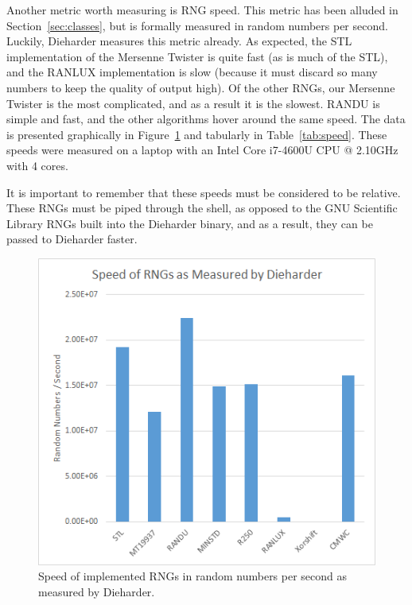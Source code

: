 

Another metric worth measuring is RNG speed. This metric has been alluded in Section~\ref{sec:classes}, but is formally measured in random numbers per second. Luckily, Dieharder measures this metric already. As expected, the STL implementation of the Mersenne Twister is quite fast (as is much of the STL), and the RANLUX implementation is slow (because it must discard so many numbers to keep the quality of output high). Of the other RNGs, our Mersenne Twister is the most complicated, and as a result it is the slowest. RANDU is simple and fast, and the other algorithms hover around the same speed. The data is presented graphically in Figure~\ref{fig:speed} and tabularly in Table~\ref{tab:speed}. These speeds were measured on a laptop with an Intel Core i7-4600U CPU @ 2.10GHz with 4 cores.

It is important to remember that these speeds must be considered to be relative. These RNGs must be piped through the shell, as opposed to the GNU Scientific Library RNGs built into the Dieharder binary, and as a result, they can be passed to Dieharder faster.

\begin{figure}[tb]
    \begin{center}
        \includegraphics[width=\linewidth]{figures/speed.png}
    \end{center}
    \caption{Speed of implemented RNGs in random numbers per second as measured by Dieharder.}
    \label{fig:speed}
\end{figure}

